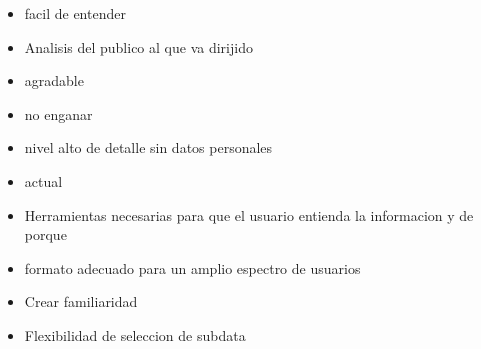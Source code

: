 \begin{itemize}
\item facil de entender
\item Analisis del publico al que va dirijido
\item agradable
\item no enganar
\item nivel alto de detalle sin datos personales
\item actual
\item Herramientas necesarias para que el usuario entienda la informacion y de porque
\item formato adecuado para un amplio espectro de usuarios
\item Crear familiaridad
\item Flexibilidad de seleccion de subdata
  \end{itemize}